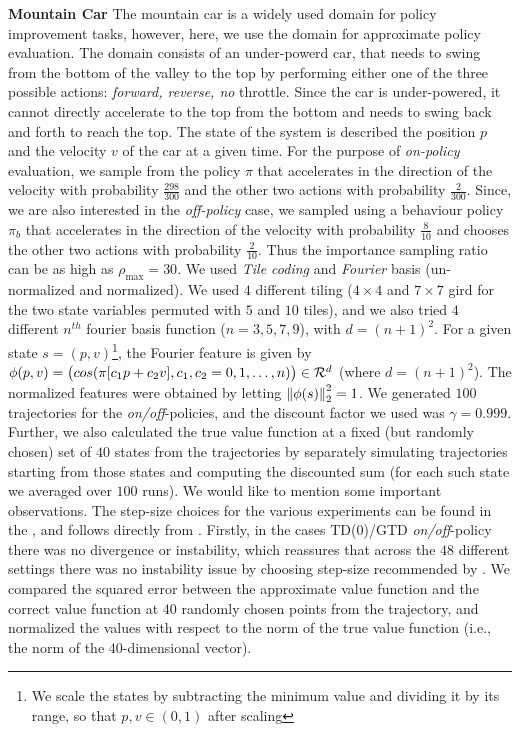 \textbf{Mountain Car}   
The mountain car is a widely used domain for policy improvement tasks, however, here, we use the domain for approximate policy evaluation. The domain consists of an under-powerd car, that needs to swing from the bottom of the valley to the top by performing either one of the three possible actions: \emph{forward, reverse, no} throttle. Since the car is under-powered, it cannot directly accelerate to the top from the bottom and needs to swing back and forth to reach the top. The state of the system is described the position $p$ and the velocity $v$ of the car at a given time. For the purpose of \emph{on-policy} evaluation, we sample from the policy $\pi$ that accelerates in the direction of the velocity with probability $\frac{298}{300}$ and the other two actions with probability $\frac{2}{300}$. Since, we are also interested in the \emph{off-policy} case, we sampled using a behaviour policy  $\pi_b$ that accelerates in the direction of the velocity with probability $\frac{8}{10}$ and chooses the other two actions with probability $\frac{2}{10}$. Thus the importance sampling ratio can be as high as $\rho_{\max}=30$. 
 We used \emph{Tile coding} and \emph{Fourier} basis (un-normalized and normalized). We used $4$ different tiling ($4\times 4$ and $7\times 7$ gird for the two state variables permuted with $5$ and $10$ tiles), and we also tried $4$ different $n^{th}$ fourier basis function ($n=3,5,7,9$), with $d=(n+1)^2$. For a given state $s=(p,v)$\footnote{We scale the states by subtracting the minimum value and dividing it by its range, so that $p,v\in(0,1)$ after scaling}, the Fourier feature is given by $\phi(p,v)=\big(cos(\pi [c_1p+c_2 v],c_1,c_2=0,1,\ldots,n)\big) \in \mathcal{R}^{d}$ (where $d=(n+1)^2$). The normalized features were obtained by letting $\left\| \phi(s)\right\|^2_2=1$. We generated $100$ trajectories for the \emph{on/off}-policies, and the discount factor we used was $\gamma=0.999$. Further, we also calculated the true value function at a fixed (but randomly chosen) set of $40$ states from the trajectories by separately simulating trajectories starting from those states and computing the discounted sum (for each such state we averaged over $100$ runs).
 We would like to mention some important observations. The step-size choices for the various experiments can be found in the , and follows directly from . Firstly, in the cases TD(0)/GTD \emph{on/off}-policy there was no divergence or instability, which reassures that across the $48$ different settings there was no instability issue by choosing step-size recommended by . We compared the squared error between the approximate value function and the correct value function at $40$ randomly chosen points from the trajectory, and normalized the values with respect to the norm of the true value function (i.e., the norm of the $40$-dimensional vector). 
 
